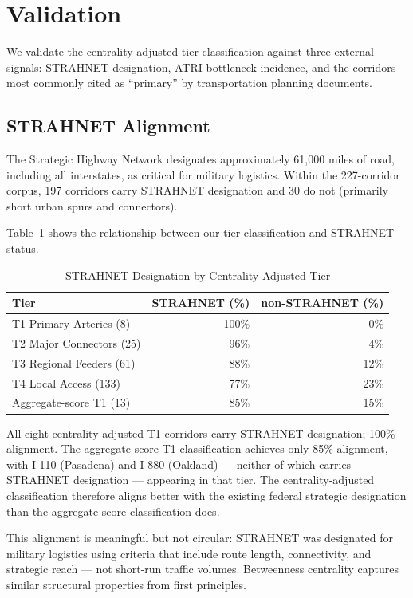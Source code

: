 \section{Validation}
\label{sec:validation}

We validate the centrality-adjusted tier classification against three external signals: STRAHNET designation, ATRI bottleneck incidence, and the corridors most commonly cited as ``primary'' by transportation planning documents.

\subsection{STRAHNET Alignment}

The Strategic Highway Network designates approximately 61,000 miles of road, including all interstates, as critical for military logistics. Within the 227-corridor corpus, 197 corridors carry STRAHNET designation and 30 do not (primarily short urban spurs and connectors).

Table~\ref{tab:strahnet} shows the relationship between our tier classification and STRAHNET status.

\begin{table}[h!]
\centering
\caption{STRAHNET Designation by Centrality-Adjusted Tier}
\label{tab:strahnet}
\begin{tabular}{lrr}
\toprule
\textbf{Tier} & \textbf{STRAHNET (\%)} & \textbf{non-STRAHNET (\%)} \\
\midrule
T1 Primary Arteries (8) & 100\% & 0\% \\
T2 Major Connectors (25) & 96\% & 4\% \\
T3 Regional Feeders (61) & 88\% & 12\% \\
T4 Local Access (133) & 77\% & 23\% \\
\midrule
Aggregate-score T1 (13) & 85\% & 15\% \\
\bottomrule
\end{tabular}
\end{table}

All eight centrality-adjusted T1 corridors carry STRAHNET designation; 100\% alignment. The aggregate-score T1 classification achieves only 85\% alignment, with I-110 (Pasadena) and I-880 (Oakland) --- neither of which carries STRAHNET designation --- appearing in that tier. The centrality-adjusted classification therefore aligns better with the existing federal strategic designation than the aggregate-score classification does.

This alignment is meaningful but not circular: STRAHNET was designated for military logistics using criteria that include route length, connectivity, and strategic reach --- not short-run traffic volumes. Betweenness centrality captures similar structural properties from first principles.

